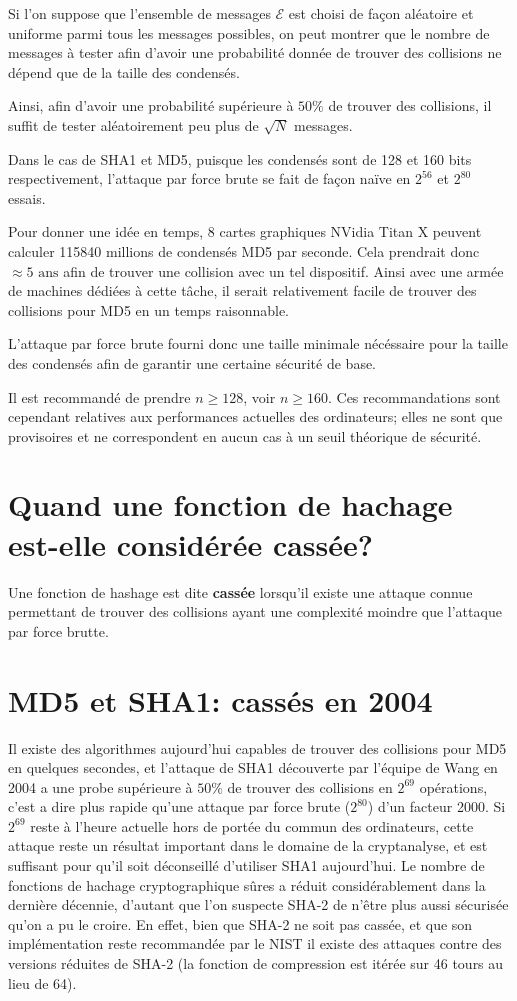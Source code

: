 \documentclass[10.5pt, a4paper, twoside, openright]{report}
\begin{document}
Si l'on suppose que l'ensemble de messages $\mathcal{E}$ est choisi de façon aléatoire et uniforme parmi tous les messages possibles, on peut montrer que le nombre de messages à tester afin d'avoir une probabilité donnée de trouver des collisions ne dépend que de la taille des condensés.

Ainsi, afin d'avoir une probabilité supérieure à $50\%$ de trouver des collisions, il suffit de tester aléatoirement peu plus de $\sqrt{N}$ messages.

Dans le cas de SHA1 et MD5, puisque les condensés sont de 128 et 160 bits respectivement, l'attaque par force brute se fait de façon naïve en $2^56$ et $2^80$ essais.

Pour donner une idée en temps, 8 cartes graphiques NVidia Titan X peuvent calculer 115840 millions de condensés MD5 par seconde. Cela prendrait donc $ \approx 5 \mbox{ ans}$ afin de trouver une collision avec un tel dispositif.
Ainsi avec une armée de machines dédiées à cette tâche, il serait relativement facile de trouver des collisions pour MD5 en un temps raisonnable.

L'attaque par force brute fourni donc une taille minimale nécéssaire pour la taille des condensés afin de garantir une certaine sécurité de base.

Il est recommandé de prendre $n \ge 128$, voir $n\ge 160$. Ces recommandations sont cependant relatives aux performances actuelles des ordinateurs; elles ne sont que provisoires et ne correspondent en aucun cas à un seuil théorique de sécurité.

\section{Quand une fonction de hachage est-elle considérée cassée?}
Une fonction de hashage est dite \textbf{cassée} lorsqu'il existe une attaque connue permettant de trouver des collisions ayant une complexité moindre que l'attaque par force brutte. 

\section{MD5 et SHA1: cassés en 2004}
Il existe des algorithmes aujourd’hui capables de trouver des collisions pour MD5 en quelques secondes, et l’attaque de SHA1 découverte par l’équipe de Wang en 2004 a une probe supérieure à $50\%$ de trouver des collisions en $2^{69}$ opérations, c’est a dire plus rapide qu’une attaque par force brute ($2^80$) d’un facteur 2000.
Si $2^{69}$ reste à l’heure actuelle hors de portée du commun des ordinateurs, cette attaque reste un résultat important dans le domaine de la cryptanalyse, et est suffisant pour qu’il soit déconseillé d’utiliser SHA1 aujourd’hui.
Le nombre de fonctions de hachage cryptographique sûres a réduit considérablement dans la dernière décennie, d’autant que l’on suspecte SHA-2 de n’être plus aussi sécurisée qu’on a pu le croire. En effet, bien que SHA-2 ne soit pas cassée, et que son implémentation reste recommandée par le NIST il existe des attaques contre des versions réduites de SHA-2 (la fonction de compression est itérée sur 46 tours au lieu de 64).
\end{document}
